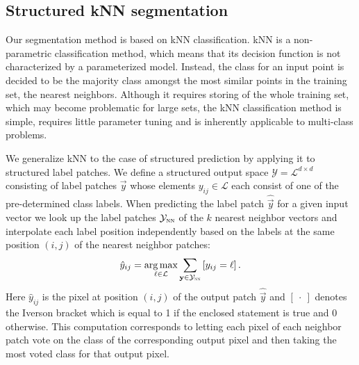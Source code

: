 \subsection{Structured \acl{kNN} segmentation}

Our segmentation method is based on \acf{kNN} classification. \ac{kNN} is a non-parametric classification method, which means that its decision function is not characterized by a parameterized model. Instead, the class for an input point is decided to be the majority class amongst the most similar points in the training set, the nearest neighbors. Although it requires storing of the whole training set, which may become problematic for large sets, the \ac{kNN} classification method is simple, requires little parameter tuning and is inherently applicable to multi-class problems. 

We generalize \ac{kNN} to the case of structured prediction by applying it to structured label patches. %
We define a structured output space $\mathcal{Y} = \mathcal{L}^{d \times d}$ consisting of label patches $\vec{y}$ whose elements $y_{ij} \in \mathcal{L}$ each consist of one of the pre-determined class labels. When predicting the label patch $\hat{\vec{y}}$ for a given input vector we look up the label patches $\mathcal{Y}_\textsc{nn}$ of the $k$ nearest neighbor vectors  and interpolate each label position independently based on the labels at the same position $(i,j)$ of the nearest neighbor patches:
\begin{equation}
\hat{y}_{ij} = \operatorname*{arg\,max}_{\ell \in \mathcal{L}} \sum_{\mathbf{y} \in \mathcal{Y}_\textsc{nn}} \left[ y_{ij} = \ell \right ].
\label{eq:nn_decision_rule}
\end{equation}
Here $\hat{y}_{ij}$ is the pixel at position $(i,j)$ of the output patch $\hat{\vec{y}}$ and $\left [\ \cdot \ \right ]$ denotes the Iverson bracket which is equal to 1 if the enclosed statement is true and 0 otherwise. This computation corresponds to letting each pixel of each neighbor patch vote on the class of the corresponding output pixel and then taking the most voted class for that output pixel.

